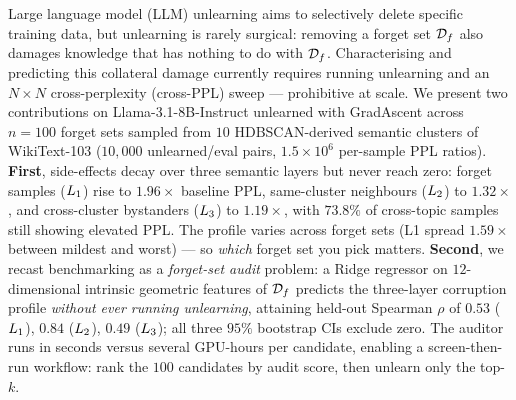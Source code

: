 Large language model (LLM) unlearning aims to selectively delete specific training data, but unlearning is rarely surgical: removing a forget set $\mathcal{D}_f$ also damages knowledge that has nothing to do with $\mathcal{D}_f$. Characterising and predicting this collateral damage currently requires running unlearning and an $N\times N$ cross-perplexity (cross-PPL) sweep --- prohibitive at scale. We present two contributions on Llama-3.1-8B-Instruct unlearned with GradAscent across $n{=}100$ forget sets sampled from $10$ HDBSCAN-derived semantic clusters of WikiText-103 ($10{,}000$ unlearned/eval pairs, $1.5\!\times\!10^{6}$ per-sample PPL ratios). \textbf{First}, side-effects decay over three semantic layers but never reach zero: forget samples ($L_1$) rise to $1.96\times$ baseline PPL, same-cluster neighbours ($L_2$) to $1.32\times$, and cross-cluster bystanders ($L_3$) to $1.19\times$, with $73.8\%$ of cross-topic samples still showing elevated PPL. The profile varies across forget sets (L1 spread $1.59\times$ between mildest and worst) --- so \emph{which} forget set you pick matters. \textbf{Second}, we recast benchmarking as a \emph{forget-set audit} problem: a Ridge regressor on $12$-dimensional intrinsic geometric features of $\mathcal{D}_f$ predicts the three-layer corruption profile \emph{without ever running unlearning}, attaining held-out Spearman $\rho$ of $0.53$ ($L_1$), $0.84$ ($L_2$), $0.49$ ($L_3$); all three $95\%$ bootstrap CIs exclude zero. The auditor runs in seconds versus several GPU-hours per candidate, enabling a screen-then-run workflow: rank the $100$ candidates by audit score, then unlearn only the top-$k$.
